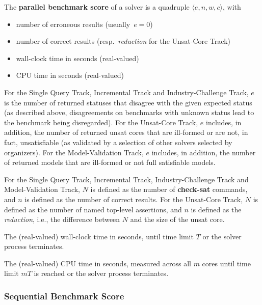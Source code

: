 \documentclass[12pt]{article}
\newcommand{\akey}[1]{\textbf{#1}\xspace}
\newcommand{\maintrack}{Single Query Track\xspace}
\newcommand{\inctrack}{Incremental Track\xspace}
\newcommand{\ucoretrack}{Unsat-Core Track\xspace}
\newcommand{\mvaltrack}{Model-Validation Track\xspace}
\newcommand{\challtrack}{Industry-Challenge Track\xspace}
\begin{document}
The \textbf{parallel benchmark score} of a solver is a quadruple $\langle
e, n, w, c\rangle$, with
\begin{itemize}[noitemsep]
  \vspace{-1ex}
  \item {}
    number of erroneous results (usually~$e = 0$)
  \item {}
    number of correct results (resp.~\emph{reduction} for the \ucoretrack)
  \item {}
    wall-clock time in seconds (real-valued)
  \item {}
    CPU time in seconds (real-valued)
\end{itemize}

For the \maintrack, \inctrack and \challtrack, $e$ is the number of returned
statuses that disagree with the given expected status (as described above,
disagreements on benchmarks with unknown status lead to the benchmark being
disregarded). For the \ucoretrack, $e$ includes, in addition, the number of
returned unsat cores that are ill-formed or are not, in fact, unsatisfiable (as
validated by a selection of other solvers selected by organizers).  For the
\mvaltrack, $e$ includes, in addition, the number of returned models that are
ill-formed or not full satisfiable models.

For the \maintrack, \inctrack, \challtrack and \mvaltrack,
$N$ is defined as the number of \akey{check-sat} commands, and
$n$ is defined as the number of correct results.
For the \ucoretrack, $N$ is defined as the number of named top-level assertions,
and $n$ is defined as the \emph{reduction}, i.e., the difference between $N$
and the size of the unsat core.

The (real-valued) wall-clock time in seconds, until time limit $T$ or the
solver process terminates.

The (real-valued) CPU time in seconds, measured across all $m$ cores
until time limit $mT$ is reached or the solver process
terminates.

\subsubsection{Sequential Benchmark Score}
\label{sec:sequential}
\end{document}
